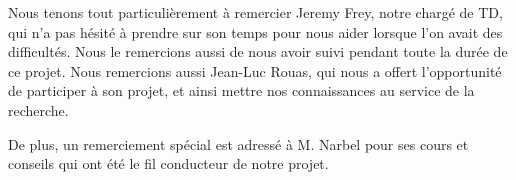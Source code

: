 \begin{thanks_perso}
Nous tenons tout particulièrement à remercier Jeremy Frey, notre chargé de TD, qui n'a pas hésité à prendre sur son temps pour nous aider lorsque l'on avait des difficultés. Nous le remercions aussi de nous avoir suivi pendant toute la durée de ce projet.
Nous remercions aussi Jean-Luc Rouas, qui nous a offert l'opportunité de participer à son projet, et ainsi mettre nos connaissances au service de la recherche.

De plus, un remerciement spécial est adressé à M. Narbel pour ses cours et conseils qui ont été le fil conducteur de notre projet.
\end{thanks_perso}